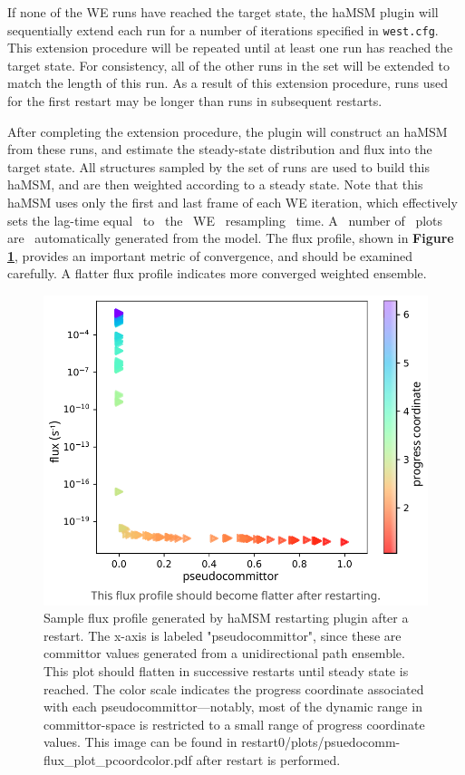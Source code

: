 If none of the WE runs have reached the target state, the haMSM plugin will sequentially extend each run for a number of iterations specified in \verb|west.cfg|. 
This extension procedure will be repeated until at least one run has reached the target state. 
For consistency, all of the other runs in the set will be extended to match the length of this run. 
As a result of this extension procedure, runs used for the first restart may be longer than runs in subsequent restarts.

After completing the extension procedure, the plugin will construct an haMSM from these runs, and estimate the steady-state distribution and flux into the target state. 
All structures sampled by the set of runs are used to build this haMSM, and are then weighted according to a steady state. 
Note that this haMSM uses only the first and last frame of each WE iteration, which effectively sets the lag-time equal~ to~ the~ WE~ resampling~ time. A~ number of~ plots~ are~ automatically generated from the model. 
The flux profile, shown in \textbf{Figure \ref{fig:flux-profile}}, provides an important metric of convergence, and should be examined carefully. 
A flatter flux profile indicates more converged weighted ensemble.

\begin{figure}[t]
    \centering
    \vspace{-0.25cm}
    \includegraphics[width=\columnwidth]{figures/Figure7_committor.pdf}
    \caption{Sample flux profile generated by haMSM restarting plugin after a restart. 
    The x-axis is labeled "pseudocommittor", since these are committor values generated from a unidirectional path ensemble. 
    This plot should flatten in successive restarts until steady state is reached.
    The color scale indicates the progress coordinate associated with each pseudocommittor---notably, most of the dynamic range in committor-space is restricted to a small range of progress coordinate values. 
    This image can be found in restart0/plots/psuedocomm-flux\_plot\_pcoordcolor.pdf after restart is performed.}
    \vspace{-0.25cm}
    \label{fig:flux-profile}
\end{figure}

